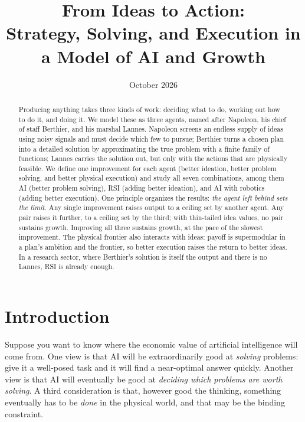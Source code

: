 \documentclass[11pt]{article}
\title{From Ideas to Action:\\[0.2em] \large Strategy, Solving, and Execution in a Model of AI and Growth}
\author{}
\date{October 2026}
\newcommand{\Nap}{\textcolor{nap}{Napoleon}}
\newcommand{\Ber}{\textcolor{ber}{Berthier}}
\newcommand{\Lan}{\textcolor{lan}{Lannes}}
\theoremstyle{remark}
\begin{document}
\maketitle

\begin{abstract}
Producing anything takes three kinds of work: deciding what to do, working out how to do it, and doing it. We model these as three agents, named after Napoleon, his chief of staff Berthier, and his marshal Lannes. \Nap{} screens an endless supply of ideas using noisy signals and must decide which few to pursue; \Ber{} turns a chosen plan into a detailed solution by approximating the true problem with a finite family of functions; \Lan{} carries the solution out, but only with the actions that are physically feasible. We define one improvement for each agent (better ideation, better problem solving, and better physical execution) and study all seven combinations, among them AI (better problem solving), RSI (adding better ideation), and AI with robotics (adding better execution). One principle organizes the results: \emph{the agent left behind sets the limit}. Any single improvement raises output to a ceiling set by another agent. Any pair raises it further, to a ceiling set by the third; with thin-tailed idea values, no pair sustains growth. Improving all three sustains growth, at the pace of the slowest improvement. The physical frontier also interacts with ideas: payoff is supermodular in a plan's ambition and the frontier, so better execution raises the return to better ideas. In a research sector, where \Ber's solution is itself the output and there is no \Lan, RSI is already enough.
\end{abstract}

\tableofcontents
\bigskip

\section{Introduction}

Suppose you want to know where the economic value of artificial intelligence will come from. One view is that AI will be extraordinarily good at \emph{solving} problems: give it a well-posed task and it will find a near-optimal answer quickly. Another view is that AI will eventually be good at \emph{deciding which problems are worth solving}. A third consideration is that, however good the thinking, something eventually has to be \emph{done} in the physical world, and that may be the binding constraint.
\end{document}
